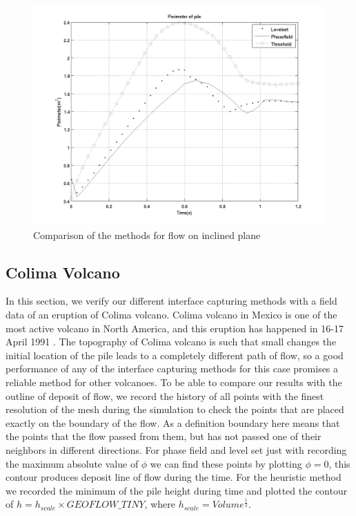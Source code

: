 \documentclass[letterpaper,10pt]{article}
\begin{document}
\begin{figure}[H]
\begin{minipage}[b]{.48 \linewidth}
    \includegraphics[scale=0.4]{IMAGES/perimeter.png}
  \end{minipage}
  \caption{Comparison of the methods for flow on inclined plane}
  \label{compinc}
\end{figure}

\subsection{Colima Volcano}
In this section, we verify our different interface capturing methods with a field data of an eruption of Colima volcano. 
Colima volcano in Mexico is one of the most active volcano in North America, and this eruption has happened in 16-17 April 1991 \cite{}. 
The topography of Colima volcano is such that small changes the initial location of the pile leads to a completely different 
path of flow, so a good performance of any of the interface capturing methods for this case promises a reliable method for other volcanoes.
To be able to compare our results with the outline of deposit of flow, we record the history of all points with the finest 
resolution of the mesh during the simulation to check the points that are placed exactly on the boundary of the flow. 
As a definition boundary here means that the points that the flow passed from them, but has not passed one of their neighbors 
in different directions. For phase field and level set just with recording the maximum absolute value of $ \phi $ we can find 
these points by plotting $\phi=0$, this contour produces deposit line of flow during the time. For the heuristic method we 
recorded the minimum of the pile height during time and plotted the contour of $ h = h_{scale} \times GEOFLOW \_ TINY$, where 
$ h_{scale} =Volume^\frac{1}{3} $.
\end{document}

